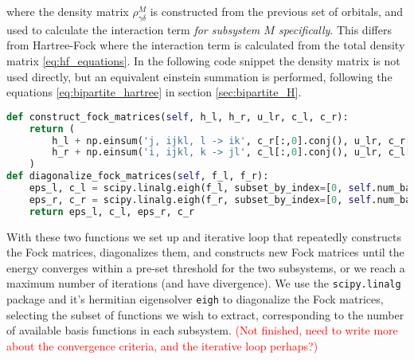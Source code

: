 \documentclass{subfiles}
\begin{document}
where the density matrix $\rho_{\gamma\delta}^{M}$ is constructed from the previous set of orbitals, and used to calculate the interaction term \emph{for subsystem $M$ specifically}. This differs from Hartree-Fock where the interaction term is calculated from the total density matrix \eqref{eq:hf_equations}. In the following code snippet the density matrix is not used directly, but an equivalent einstein summation is performed, following the equations \eqref{eq:bipartite_hartree} in section \ref{sec:bipartite_H}.
\begin{lstlisting}[language=Python]
def construct_fock_matrices(self, h_l, h_r, u_lr, c_l, c_r):
    return (
        h_l + np.einsum('j, ijkl, l -> ik', c_r[:,0].conj(), u_lr, c_r[:,0]),
        h_r + np.einsum('i, ijkl, k -> jl', c_l[:,0].conj(), u_lr, c_l[:,0]),
    )
def diagonalize_fock_matrices(self, f_l, f_r):
    eps_l, c_l = scipy.linalg.eigh(f_l, subset_by_index=[0, self.num_basis_l - 1])
    eps_r, c_r = scipy.linalg.eigh(f_r, subset_by_index=[0, self.num_basis_r - 1])
    return eps_l, c_l, eps_r, c_r
\end{lstlisting}
With these two functions we set up and iterative loop that repeatedly constructs the Fock matrices, diagonalizes them, and constructs new Fock matrices until the energy converges within a pre-set threshold for the two subsystems, or we reach a maximum number of iterations (and have divergence). We use the \texttt{scipy.linalg}\cite{2020SciPy-NMeth} package and it's hermitian eigensolver \texttt{eigh} to diagonalize the Fock matrices, selecting the subset of functions we wish to extract, corresponding to the number of available basis functions in each subsystem. \textcolor{red}{(Not finished, need to write more about the convergence criteria, and the iterative loop perhaps?)}
\end{document}
